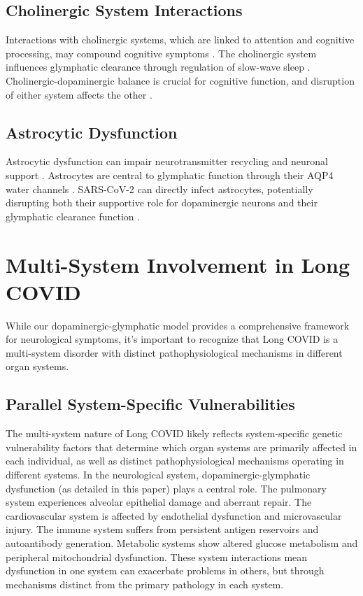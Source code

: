 \documentclass[12pt]{article}
\begin{document}
\subsection{Cholinergic System Interactions}

Interactions with cholinergic systems, which are linked to attention and cognitive processing, may compound cognitive symptoms \citep{leitzke2025cholinergic}. The cholinergic system influences glymphatic clearance through regulation of slow-wave sleep \citep{Hablitz2019}. Cholinergic-dopaminergic balance is crucial for cognitive function, and disruption of either system affects the other \citep{Grizzell2014}.

\subsection{Astrocytic Dysfunction}

Astrocytic dysfunction can impair neurotransmitter recycling and neuronal support \citep{crunfli2023astrocytes}. Astrocytes are central to glymphatic function through their AQP4 water channels \citep{Mestre2018}. SARS-CoV-2 can directly infect astrocytes, potentially disrupting both their supportive role for dopaminergic neurons and their glymphatic clearance function \citep{crunfli2023astrocytes}.

\section{Multi-System Involvement in Long COVID}

While our dopaminergic-glymphatic model provides a comprehensive framework for neurological symptoms, it's important to recognize that Long COVID is a multi-system disorder with distinct pathophysiological mechanisms in different organ systems.

\subsection{Parallel System-Specific Vulnerabilities}

The multi-system nature of Long COVID likely reflects system-specific genetic vulnerability factors that determine which organ systems are primarily affected in each individual, as well as distinct pathophysiological mechanisms operating in different systems. In the neurological system, dopaminergic-glymphatic dysfunction (as detailed in this paper) plays a central role. The pulmonary system experiences alveolar epithelial damage and aberrant repair. The cardiovascular system is affected by endothelial dysfunction and microvascular injury. The immune system suffers from persistent antigen reservoirs and autoantibody generation. Metabolic systems show altered glucose metabolism and peripheral mitochondrial dysfunction. These system interactions mean dysfunction in one system can exacerbate problems in others, but through mechanisms distinct from the primary pathology in each system.
\end{document}
